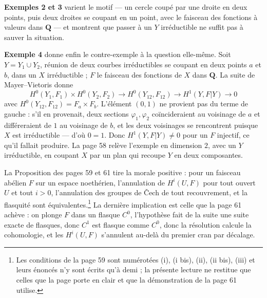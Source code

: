 \documentclass[11pt,a4paper]{article}
\begin{document}
\textbf{Exemples 2 et 3} varient le motif — un cercle coupé par une droite en
deux points, puis deux droites se coupant en un point, avec le faisceau des
fonctions à valeurs dans $\mathbf{Q}$ — et montrent que passer à un $Y$
irréductible ne suffit pas à sauver la situation.

\begin{center}
\end{center}


\textbf{Exemple 4} donne enfin le contre-exemple à la question elle-même. Soit
$Y = Y_1 \cup Y_2$, réunion de deux courbes irréductibles se coupant en deux
points $a$ et $b$, dans un $X$ irréductible ; $F$ le faisceau des fonctions de
$X$ dans $\mathbf{Q}$. La suite de Mayer--Vietoris donne
\[
H^0(Y_1, F_1) \times H^0(Y_2, F_2) \longrightarrow H^0(Y_{12}, F_{12})
\longrightarrow H^1(Y, F|Y) \longrightarrow 0
\]
avec $H^0(Y_{12}, F_{12}) = F_a \times F_b$. L'élément $(0,1)$ ne provient pas
du terme de gauche : s'il en provenait, deux sections $\varphi_1, \varphi_2$
coïncideraient au voisinage de $a$ et différeraient de $1$ au voisinage de $b$,
et les deux voisinages se rencontrent puisque $X$ est irréductible — d'où
$0 = 1$. Donc $H^1(Y, F|Y) \neq 0$ pour un $F$ injectif, ce qu'il fallait
produire. La page 58 relève l'exemple en dimension $2$, avec un $Y$ irréductible,
en coupant $X$ par un plan qui recoupe $Y$ en deux composantes.

La Proposition des pages 59 et 61 tire la morale positive : pour un faisceau
abélien $F$ sur un espace noethérien, l'annulation de $H^i(U,F)$ pour tout
ouvert $U$ et tout $i > 0$, l'annulation des groupes de Čech de tout
recouvrement, et la flasquité sont équivalentes.\footnote{Les conditions de la
page 59 sont numérotées (i), (i bis), (ii), (ii bis), (iii) et leurs énoncés
n'y sont écrits qu'à demi ; la présente lecture ne restitue que celles que la
page porte en clair et que la démonstration de la page 61 utilise.} La dernière
implication est celle que la page 61 achève : on plonge $F$ dans un flasque
$C^0$, l'hypothèse fait de la suite une suite exacte de flasques, donc $C^1$
est flasque comme $C^0$, donc la résolution calcule la cohomologie, et les
$H^i(U,F)$ s'annulent au-delà du premier cran par décalage.
\end{document}
